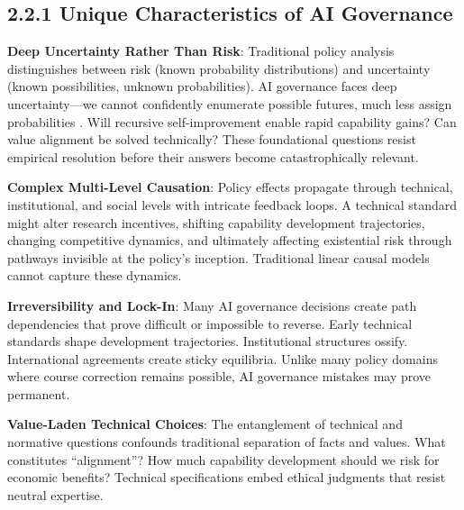 \documentclass[
  11pt,
  letterpaper,
]{book}
\begin{document}
\subsection{2.2.1 Unique Characteristics of AI
Governance}\label{unique-characteristics-of-ai-governance}

\textbf{Deep Uncertainty Rather Than Risk}: Traditional policy analysis
distinguishes between risk (known probability distributions) and
uncertainty (known possibilities, unknown probabilities). AI governance
faces deep uncertainty---we cannot confidently enumerate possible
futures, much less assign probabilities \textcite{hallegatte2012}. Will
recursive self-improvement enable rapid capability gains? Can value
alignment be solved technically? These foundational questions resist
empirical resolution before their answers become catastrophically
relevant.

\textbf{Complex Multi-Level Causation}: Policy effects propagate through
technical, institutional, and social levels with intricate feedback
loops. A technical standard might alter research incentives, shifting
capability development trajectories, changing competitive dynamics, and
ultimately affecting existential risk through pathways invisible at the
policy's inception. Traditional linear causal models cannot capture
these dynamics.

\textbf{Irreversibility and Lock-In}: Many AI governance decisions
create path dependencies that prove difficult or impossible to reverse.
Early technical standards shape development trajectories. Institutional
structures ossify. International agreements create sticky equilibria.
Unlike many policy domains where course correction remains possible, AI
governance mistakes may prove permanent.

\textbf{Value-Laden Technical Choices}: The entanglement of technical
and normative questions confounds traditional separation of facts and
values. What constitutes ``alignment''? How much capability development
should we risk for economic benefits? Technical specifications embed
ethical judgments that resist neutral expertise.
\end{document}
